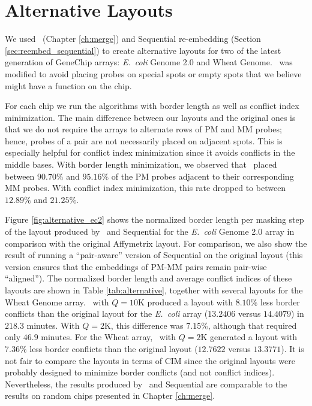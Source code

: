 \section{Alternative Layouts}
\label{sec:affy_alternative}

We used \Greedyplus\ (Chapter \ref{ch:merge}) and Sequential re-embedding
(Section \ref{sec:reembed_sequential}) to create alternative layouts for two of
the latest generation of GeneChip arrays: \emph{E.\ coli} Genome 2.0 and Wheat Genome.
\Greedyplus\ was modified to avoid placing probes on special spots or empty
spots that we believe might have a function on the chip.

For each chip we run the algorithms with border length as well as conflict index
minimization. The main difference between our layouts and the original ones is
that we do not require the arrays to alternate rows of PM and MM probes; hence,
probes of a pair are not necessarily placed on adjacent spots. This is
especially helpful for conflict index minimization since it avoids conflicts in
the middle bases. With border length minimization, we observed that \Greedyplus\
placed between $90.70\%$ and $95.16\%$ of the PM probes adjacent to their
corresponding MM probes. With conflict index minimization, this rate dropped to
between $12.89\%$ and $21.25\%$.

Figure \ref{fig:alternative_ec2} shows the normalized border length per masking
step of the layout produced by \Greedyplus\ and Sequential for the \emph{E.\ coli}
Genome 2.0 array in comparison with the original Affymetrix layout. For
comparison, we also show the result of running a ``pair-aware'' version of
Sequential on the original layout (this version ensures that the embeddings of
PM-MM pairs remain pair-wise ``aligned''). The normalized border length and
average conflict indices of these layouts are shown in Table
\ref{tab:alternative}, together with several layouts for the Wheat Genome array.
\Greedyplus\ with $Q=10$K produced a layout with $8.10\%$ less border conflicts
than the original layout for the \emph{E.\ coli} array ($13.2406$ versus $14.4079$) in
$218.3$ minutes. With $Q=2$K, this difference was $7.15\%$, although that
required only $46.9$ minutes. For the Wheat array, \Greedyplus\ with $Q=2$K
generated a layout with $7.36\%$ less border conflicts than the original layout
($12.7622$ versus $13.3771$). It is not fair to compare the layouts in terms of
CIM since the original layouts were probably designed to minimize border
conflicts (and not conflict indices). Nevertheless, the results produced by
\Greedyplus\ and Sequential are comparable to the results on random chips
presented in Chapter \ref{ch:merge}.


